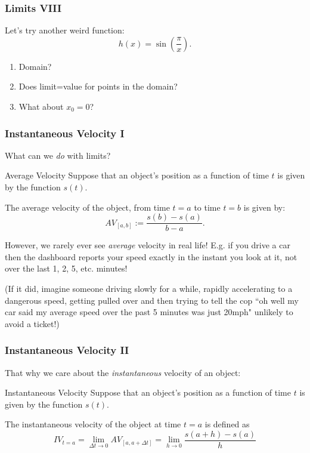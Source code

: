 \documentclass{ltx-talk}
\begin{document}
\begin{frame}
  \frametitle{Limits VIII}
  Let's try another weird function: \pause
  \begin{equation}
    h(x) = \sin(\dfrac{\pi}{x}).
  \end{equation} \pause

  \begin{enumerate}
    \item Domain? \pause
    \item Does limit=value for points in the domain? \pause
    \item What about $x_0 = 0$?
  \end{enumerate}
\end{frame}

\begin{frame}
  \frametitle{Instantaneous Velocity I}

  What can we \textit{do} with limits? \pause

  \begin{block}{Average Velocity}
    Suppose that an object's position as a function of time $t$
    is given by the function $s(t)$. \pause

    The average velocity of the object, from time $t = a$ to time $t = b$
    is given by: \pause
    \begin{equation}
      AV_{[a, b]} := \dfrac{s(b) - s(a)}{b - a}.
    \end{equation} \pause
  \end{block}

  However, we rarely ever see \textit{average} velocity in real life! \pause
  E.g. if you drive a car then the dashboard reports your speed exactly
  in the instant you look at it, not over the last 1, 2, 5, etc. minutes! \pause

  (If it did, imagine someone driving slowly for a while, 
  rapidly accelerating to a dangerous speed,
  getting pulled over and then trying to tell the cop
  ``oh well my car said my average speed over the past 5 minutes was just 20mph"
  unlikely to avoid a ticket!)
\end{frame}

\begin{frame}
  \frametitle{Instantaneous Velocity II}
  That why we care about the \textit{instantaneous} velocity of an object: \pause

  \begin{block}{Instantaneous Velocity}
    Suppose that an object's position as a function of time $t$
    is given by the function $s(t)$. \pause

    The instantaneous velocity of the object at time $t = a$ is defined as \pause
    \begin{equation}
      IV_{t = a} = \lim_{\Delta t \rightarrow 0} AV_{[a, a + \Delta t]} = \lim_{h \rightarrow 0} \dfrac{s(a + h) - s(a)}{h}
    \end{equation}
  \end{block}
\end{frame}
\end{document}
